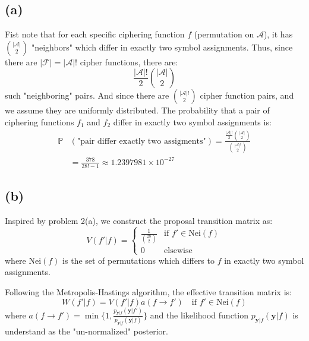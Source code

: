 \documentclass[12pt]{article}
\begin{document}
\subsection{(a)}
Fist note that for each specific ciphering function $f$ (permutation on $\mathcal{A}$), it has ${|\mathcal{A}|\choose2}$ "neighbors" which differ in exactly two symbol assignments. Thus, since there are $|\mathcal{F}| = |\mathcal{A}|!$ cipher functions, there are:
\begin{equation}
	\frac{|\mathcal{A}|!}{2}{|\mathcal{A}|\choose2}
\end{equation}
such "neighboring" pairs. And since there are ${|\mathcal{A}|!\choose2}$ cipher function pairs, and we assume they are uniformly distributed. The probability that a pair of ciphering functions $f_1$ and $f_2$ differ in exactly two symbol assignments is:
\begin{equation}
\begin{split}
	\mathbb{P}&(\text{"pair differ  exactly two assigments"}) = \frac{\frac{|\mathcal{A}|!}{2}{|\mathcal{A}|\choose2}}{{|\mathcal{A}|!\choose2}} \\ & = \frac{378}{28!-1} \approx 1.2397981\times{10}^{-27}
\end{split}
\end{equation}

\subsection{(b)}
Inspired by problem 2(a), we construct the proposal transition matrix as:
\begin{equation}
V(f'|f) =
\begin{cases}
\frac{1}{{28\choose2}} & \text{if } f'\in \text{Nei}(f) \\
0 & \text{elsewise}
\end{cases}
\end{equation}
where $\text{Nei}(f)$ is the set of permutations which differs to $f$ in exactly two symbol assignments.

Following the Metropolis-Hastings algorithm, the effective transition matrix is:
\begin{equation}
	W(f'|f) = V(f'|f)a(f\to f')\quad\text{if }f'\in \text{Nei}(f)
\end{equation}
where $a(f\to f') = \min\big\{1, \frac{p_{\mathbf{y}|f}(\mathbf{y}|f')}{p_{\mathbf{y}|f}(\mathbf{y}|f)}\big\}$ and the likelihood function $p_{\mathbf{y}|f}(\mathbf{y}|f)$ is understand as the "un-normalized" posterior.
\end{document}
